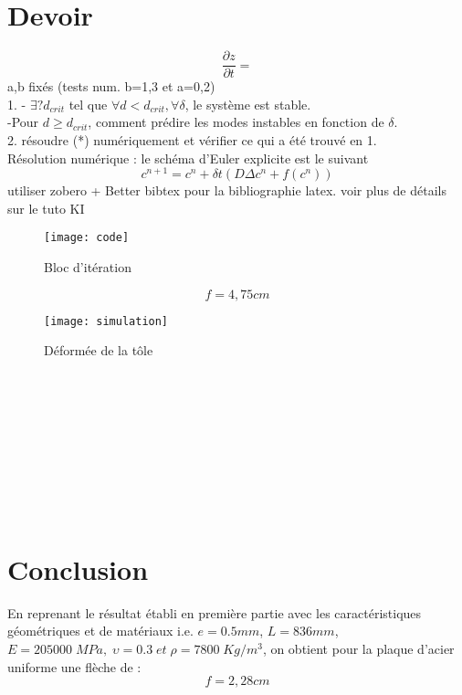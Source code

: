 \documentclass[12pt,a4paper]{article}
\begin{document}
\section{Devoir}
\begin{equation}
\dfrac{\partial z}{\partial t}= 
\end{equation}
a,b fixés (tests num. b=1,3 et a=0,2)\\

1.  - $\exists ? d_{crit}$ tel que $\forall d<d_{crit}, \forall\delta$, le système est stable.\\
-Pour $d \geq  d_{crit}$, comment prédire les modes instables en fonction de $\delta$.\\

2. résoudre (*) numériquement et vérifier ce qui a été trouvé en 1.\\


Résolution numérique : le schéma d'Euler explicite est le suivant
\begin{equation}
c^{n+1}=c^n+ \delta t ( D \Delta c^n + f(c^n))
\end{equation}
utiliser zobero + Better bibtex pour la bibliographie latex. voir plus de détails sur le tuto KI






\begin{figure}[h]
\centering
\texttt{[image: code]}
\caption{Bloc d'itération 
         \label{fig:exemple}}
\end{figure}
\begin{equation}
f=4,75 cm
\end{equation}
\begin{figure}[h]
\centering
\texttt{[image: simulation]}
\caption{Déformée de la tôle 
         \label{fig:exemple}}
\end{figure}
\\
\\
\\
\\
\\
\\
\\
\\
\section{Conclusion}
En reprenant le résultat établi en première partie avec les caractéristiques géométriques et de matériaux i.e. $e=0.5mm$, $L=836mm$, $ E=205000\;MPa,\;\upsilon = 0.3\;et\;\rho=7800\;Kg/m^{3}$, on obtient pour la plaque d’acier uniforme une flèche de :
\begin{equation}
f=2,28 cm
\end{equation}\\
\end{document}
